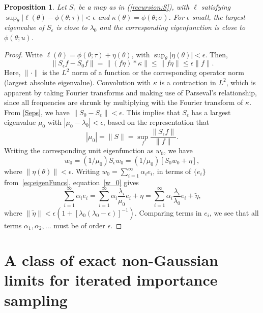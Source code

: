 \documentclass[11pt]{article}
\newcommand\mytheta{\theta}
\newcommand\lik{\ell}
\newtheorem{prop}{Proposition}
\begin{document}
\begin{prop}\label{prop:cont}
Let $S_\epsilon$ be a map as in (\ref{recursion:S}), with $\lik$ satisfying $\sup_\mytheta|\lik(\mytheta)-\phi(\mytheta;\tau)|<\epsilon$ and $\kappa(\mytheta)=\phi(\mytheta;\sigma)$. 
For $\epsilon$ small, the largest eigenvalue of $S_\epsilon$ is close to $\lambda_0$ and the corresponding eigenfunction is close to $\phi(\mytheta;u)$.
\end{prop}
\begin{proof}
Write $\lik(\mytheta)=\phi(\mytheta;\tau)+\eta(\mytheta)$, with $\sup_\mytheta |\eta(\mytheta)|<\epsilon$. Then,
\begin{equation}
\label{Seps}
\| S_\epsilon f - S_0 f \| = \|(f\eta)*\kappa \| \le \| f\eta\| \le \epsilon \|f\|.
\end{equation}
Here, $\|\cdot\|$ is the $L^2$ norm of a function or the corresponding operator norm (largest absolute eigenvalue). 
Convolution with $\kappa$ is a contraction in $L^2$, which is apparent by taking Fourier transforms and making use of Parseval's relationship, since all frequencies are shrunk by multiplying with the Fourier transform of $\kappa$.
From \eqref{Seps}, we have $\|S_0-S_\epsilon \|<\epsilon$. 
This implies that $S_\epsilon$ has a largest eigenvalue $\mu_0$ with $|\mu_0-\lambda_0|<\epsilon$, based on the representation that
\begin{equation}
|\mu_0| = \| S\| = \sup_f \frac{\|S_\epsilon f \|}{\|f \|}.
\end{equation}
Writing the corresponding unit eigenfunction as $w_0$, we have
\begin{equation}
\label{w_0}
w_0 = (1/\mu_0) S_\epsilon w_0 = (1/\mu_0)[S_0 w_0 + \eta],
\end{equation}
where $\|\eta(\mytheta)\|<\epsilon$. Writing $w_0=\sum_{i=1}^\infty \alpha_i e_i$, in terms of $\{e_i\}$ from~\eqref{eq:eigenFuncs}, equation~\eqref{w_0} gives
\begin{equation}
\sum_{i=1}^\infty \alpha_i e_i = \sum_{i=1}^\infty \alpha_i\frac{\lambda_i}{\mu_0} e_i
+\eta = \sum_{i=1}^\infty \alpha_i\frac{\lambda_i}{\lambda_0} e_i
+ \tilde \eta,
\end{equation}
where $\|\tilde \eta\| < \epsilon(1+[\lambda_0(\lambda_0-\epsilon)]^{-1})$.
Comparing terms in $e_i$, we see that all terms $\alpha_1,\alpha_2,\dots$ must be of order $\epsilon$.
\end{proof}

\section{A class of exact non-Gaussian limits for iterated importance sampling}\label{sec:conjugate}
\end{document}

